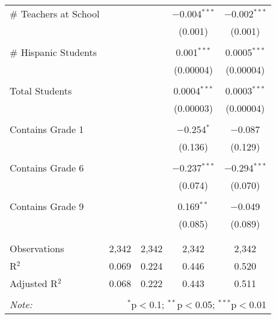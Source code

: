 \begin{table}[!htbp]
\begin{tabular}{@{\extracolsep{-2pt}}lcccc}
 \# Teachers at School &  &  & $-$0.004$^{***}$ & $-$0.002$^{***}$ \\ 
  &  &  & (0.001) & (0.001) \\ 
  & & & & \\ 
 \# Hispanic Students &  &  & 0.001$^{***}$ & 0.0005$^{***}$ \\ 
  &  &  & (0.00004) & (0.00004) \\ 
  & & & & \\ 
 Total Students &  &  & 0.0004$^{***}$ & 0.0003$^{***}$ \\ 
  &  &  & (0.00003) & (0.00004) \\ 
  & & & & \\ 
 Contains Grade 1 &  &  & $-$0.254$^{*}$ & $-$0.087 \\ 
  &  &  & (0.136) & (0.129) \\ 
  & & & & \\ 
 Contains Grade 6 &  &  & $-$0.237$^{***}$ & $-$0.294$^{***}$ \\ 
  &  &  & (0.074) & (0.070) \\ 
  & & & & \\ 
 Contains Grade 9 &  &  & 0.169$^{**}$ & $-$0.049 \\ 
  &  &  & (0.085) & (0.089) \\ 
  & & & & \\ 
\hline \\[-1.8ex] 
Observations & 2,342 & 2,342 & 2,342 & 2,342 \\ 
R$^{2}$ & 0.069 & 0.224 & 0.446 & 0.520 \\ 
Adjusted R$^{2}$ & 0.068 & 0.222 & 0.443 & 0.511 \\ 
\hline 
\hline \\[-1.8ex] 
\textit{Note:}  & \multicolumn{4}{r}{$^{*}$p$<$0.1; $^{**}$p$<$0.05; $^{***}$p$<$0.01} \\ 
\end{tabular} 
\end{table} 
